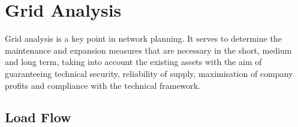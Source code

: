 



\section{Grid Analysis}

Grid analysis is a key point in network planning. It serves to determine the maintenance and expansion measures that are necessary in the short, medium and long term, taking into account the existing assets with the aim of guaranteeing technical security, reliability of supply, maximisation of company profits and compliance with the technical framework. 

\subsection{Load Flow}

